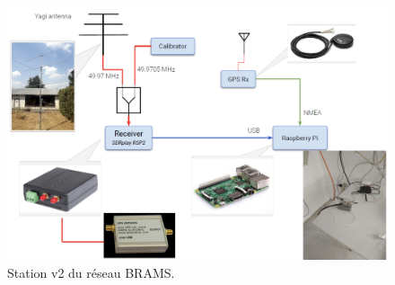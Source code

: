 \documentclass[11pt]{article}
\begin{document}
\begin{figure}[t]
    \begin{center}
        \includegraphics[scale=0.3]{schema_rsp2.png}
        \caption{Station v2 du réseau BRAMS.}
        \label{fig:station_rsp2}
    \end{center}
\end{figure}

\end{document}
